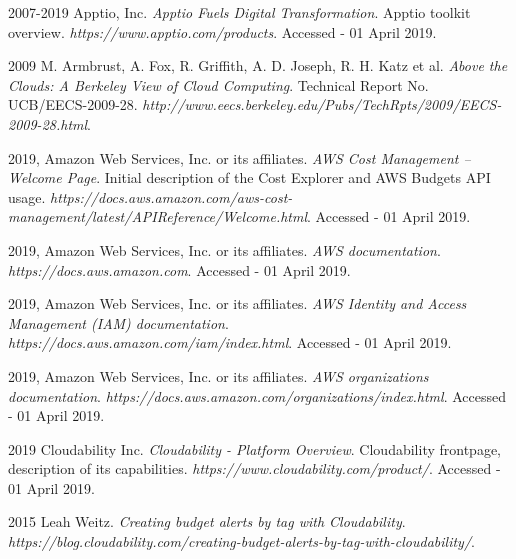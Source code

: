 \documentclass[licencjacka,en]{thesisclass}
\begin{document}
    \begin{thebibliography}{99}

        2007-2019 Apptio, Inc.
        \textit{Apptio Fuels Digital Transformation}.
        Apptio toolkit overview.
        \textit{https://www.apptio.com/products}.
        Accessed - 01 April 2019.

        2009 M. Armbrust, A. Fox, R. Griffith, A. D. Joseph, R. H. Katz et al.
        \textit{Above the Clouds: A Berkeley View of Cloud Computing}.
        Technical Report No. UCB/EECS-2009-28.
        \textit{http://www.eecs.berkeley.edu/Pubs/TechRpts/2009/EECS-2009-28.html}.

        2019, Amazon Web Services, Inc. or its affiliates.
        \textit{AWS Cost Management -- Welcome Page}.
        Initial description of the Cost Explorer and AWS Budgets API usage.
        \textit{https://docs.aws.amazon.com/aws-cost-management/latest/APIReference/Welcome.html}.
        Accessed - 01 April 2019.

        2019, Amazon Web Services, Inc. or its affiliates.
        \textit{AWS documentation}.
        \textit{https://docs.aws.amazon.com}.
        Accessed - 01 April 2019.

        2019, Amazon Web Services, Inc. or its affiliates.
        \textit{AWS Identity and Access Management (IAM) documentation}.
        \textit{https://docs.aws.amazon.com/iam/index.html}.
        Accessed - 01 April 2019.

        2019, Amazon Web Services, Inc. or its affiliates.
        \textit{AWS organizations documentation}.
        \textit{https://docs.aws.amazon.com/organizations/index.html}.
        Accessed - 01 April 2019.

        2019 Cloudability Inc.
        \textit{Cloudability - Platform Overview}.
        Cloudability frontpage, description of its capabilities.
        \textit{https://www.cloudability.com/product/}.
        Accessed - 01 April 2019.

        2015 Leah Weitz.
        \textit{Creating budget alerts by tag with Cloudability}.
        \textit{https://blog.cloudability.com/creating-budget-alerts-by-tag-with-cloudability/}.


\end{thebibliography}
\end{document}
